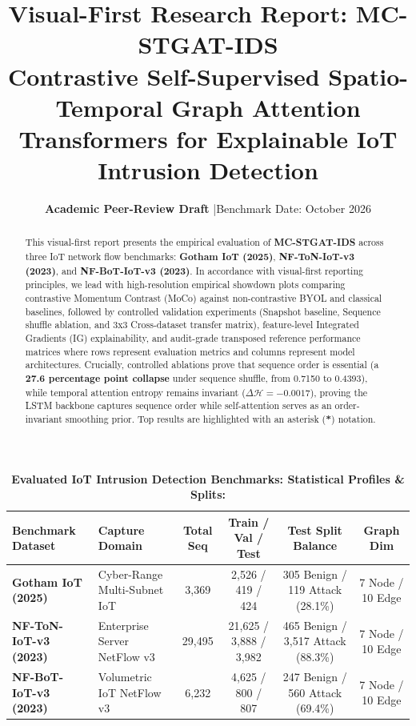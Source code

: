 \documentclass[10pt,a4paper]{article}
\title{\vspace{-1.5em}\textbf{\textcolor{primaryblue}{Visual-First Research Report: MC-STGAT-IDS}}\\\large Contrastive Self-Supervised Spatio-Temporal Graph Attention Transformers for Explainable IoT Intrusion Detection\vspace{-0.5em}}
\author{\textbf{Academic Peer-Review Draft} \quad|\quad Benchmark Date: October 2026}
\date{\vspace{-1em}}
\begin{document}
\maketitle

\begin{abstract}
\noindent This visual-first report presents the empirical evaluation of \textbf{MC-STGAT-IDS} across three IoT network flow benchmarks: \textbf{Gotham IoT (2025)}, \textbf{NF-ToN-IoT-v3 (2023)}, and \textbf{NF-BoT-IoT-v3 (2023)}. In accordance with visual-first reporting principles, we lead with high-resolution empirical showdown plots comparing contrastive Momentum Contrast (MoCo) against non-contrastive BYOL and classical baselines, followed by controlled validation experiments (Snapshot baseline, Sequence shuffle ablation, and 3x3 Cross-dataset transfer matrix), feature-level Integrated Gradients (IG) explainability, and audit-grade transposed reference performance matrices where rows represent evaluation metrics and columns represent model architectures. Crucially, controlled ablations prove that sequence order is essential (a \textbf{27.6 percentage point collapse} under sequence shuffle, from 0.7150 to 0.4393), while temporal attention entropy remains invariant ($\Delta\mathcal{H} = -0.0017$), proving the LSTM backbone captures sequence order while self-attention serves as an order-invariant smoothing prior. Top results are highlighted with an asterisk (\textbf{*}) notation.
\end{abstract}

\vspace{-0.5em}
\begin{table}[htbp]
\centering
\small
\caption{\textbf{Evaluated IoT Intrusion Detection Benchmarks: Statistical Profiles \& Splits:}}
\begin{tabularx}{\textwidth}{lXcccc}
\toprule
\textbf{Benchmark Dataset} & \textbf{Capture Domain} & \textbf{Total Seq} & \textbf{Train / Val / Test} & \textbf{Test Split Balance} & \textbf{Graph Dim} \\
\midrule
\textbf{Gotham IoT (2025)} & Cyber-Range Multi-Subnet IoT & 3,369 & 2,526 / 419 / 424 & 305 Benign / 119 Attack (28.1\%) & 7 Node / 10 Edge \\
\textbf{NF-ToN-IoT-v3 (2023)} & Enterprise Server NetFlow v3 & 29,495 & 21,625 / 3,888 / 3,982 & 465 Benign / 3,517 Attack (88.3\%) & 7 Node / 10 Edge \\
\textbf{NF-BoT-IoT-v3 (2023)} & Volumetric IoT NetFlow v3 & 6,232 & 4,625 / 800 / 807 & 247 Benign / 560 Attack (69.4\%) & 7 Node / 10 Edge \\
\bottomrule
\end{tabularx}
\label{tab:datasets}
\end{table}
\end{document}
